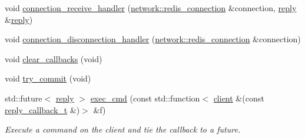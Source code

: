 \begin{DoxyCompactItemize}
\item 
void \hyperlink{classcpp__redis_1_1client_ac9e2229d4d20db863681447e24046aef}{connection\+\_\+receive\+\_\+handler} (\hyperlink{classcpp__redis_1_1network_1_1redis__connection}{network\+::redis\+\_\+connection} \&connection, \hyperlink{classcpp__redis_1_1reply}{reply} \&\hyperlink{classcpp__redis_1_1reply}{reply})
\item 
void \hyperlink{classcpp__redis_1_1client_aaa3442a618a8a0029aebb0595efaf13d}{connection\+\_\+disconnection\+\_\+handler} (\hyperlink{classcpp__redis_1_1network_1_1redis__connection}{network\+::redis\+\_\+connection} \&connection)
\item 
void \hyperlink{classcpp__redis_1_1client_a64585796534941c024eaaa72f93d8977}{clear\+\_\+callbacks} (void)
\item 
void \hyperlink{classcpp__redis_1_1client_a6c7aff2567b5ca7f527faa4f2ebca405}{try\+\_\+commit} (void)
\item 
std\+::future$<$ \hyperlink{classcpp__redis_1_1reply}{reply} $>$ \hyperlink{classcpp__redis_1_1client_a3097bc84df061096c553cb5b03d85f0a}{exec\+\_\+cmd} (const std\+::function$<$ \hyperlink{classcpp__redis_1_1client}{client} \&(const \hyperlink{classcpp__redis_1_1client_a061a1140d36d2eaeda82b09a0bb3f9f2}{reply\+\_\+callback\+\_\+t} \&)$>$ \&f)
\begin{DoxyCompactList}\small\item\em Execute a command on the client and tie the callback to a future. \end{DoxyCompactList}\end{DoxyCompactItemize}
